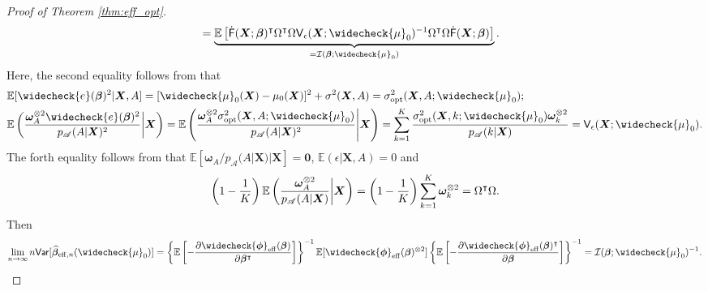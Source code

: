 \documentclass[11pt]{article}
\numberwithin{equation}{section}
\theoremstyle{definition}
\theoremstyle{remark}
\newcommand{\bX}{\bm{X}}
\newcommand{\bbeta}{\bm{\beta}}
\newcommand{\bomega}{\bm{\omega}}
\newcommand{\bphi}{\bm{\phi}}
\newcommand{\bbE}{\mathbb{E}}
\newcommand{\cI}{\mathcal{I}}
\newcommand{\sA}{\mathscr{A}}
\newcommand{\sfF}{\mathsf{F}}
\newcommand{\sfV}{\mathsf{V}}
\newcommand{\sfvar}{\mathsf{Var}}
\newcommand{\bzero}{\mathbf{0}}	%
\newcommand{\eff}{\mathrm{eff}}
\newcommand{\opt}{\mathrm{opt}}
\begin{document}
\begin{proof}[Proof of Theorem \ref{thm:eff_opt}]
\begin{align*}
	&= \underbrace{\bbE\left[ \dot{\sfF}(\bX;\bbeta)^{\intercal}\Omega^{\intercal}\Omega \sfV_{\epsilon}(\bX;\widecheck{\mu}_{0})^{-1} \Omega^{\intercal}\Omega\dot{\sfF}(\bX;\bbeta) \right]}_{= \cI(\bbeta;\widecheck{\mu}_{0})}.
	\end{align*}
	Here, the second equality follows from that
	\begin{align*}
		&\bbE[\widecheck{e}(\bbeta)^{2}|\bX,A] = [\widecheck{\mu}_{0}(\bX) - \mu_{0}(\bX)]^{2} + \sigma^{2}(\bX,A) = \sigma_{\opt}^{2}(\bX,A;\widecheck{\mu}_{0});\\
		&\bbE\left( {\bomega_{A}^{\otimes 2}\widecheck{e}(\bbeta)^{2} \over p_{\sA}(A|\bX)^{2}}\middle|\bX \right) = \bbE\left( {\bomega_{A}^{\otimes 2}\sigma_{\opt}^{2}(\bX,A;\widecheck{\mu}_{0}) \over p_{\sA}(A|\bX)^{2}}\middle|\bX \right) = \sum_{k=1}^{K}{\sigma_{\opt}^{2}(\bX,k;\widecheck{\mu}_{0})\bomega_{k}^{\otimes 2} \over p_{\sA}(k|\bX)} = \sfV_{\epsilon}(\bX;\widecheck{\mu}_{0}).
	\end{align*}
	The forth equality follows from that $ \bbE[\bomega_{A}/p_{\sA}(A|\bX)|\bX] = \bzero $, $ \bbE(\epsilon|\bX,A) = 0 $ and
	\[ \left( 1 - {1 \over K} \right)\bbE\left( {\bomega_{A}^{\otimes 2} \over p_{\sA}(A|\bX)}\middle|\bX \right) = \left( 1 - {1 \over K} \right)\sum_{k=1}^{K}\bomega_{k}^{\otimes 2} = \Omega^{\intercal}\Omega. \]
	Then
	\[ \lim_{n\to\infty}n\sfvar[\widehat{\bbeta}_{\eff,n}(\widecheck{\mu}_{0})] = \left\{ \bbE \left[-{\partial \widecheck{\bphi}_{\eff}(\bbeta) \over \partial \bbeta^{\intercal}}\right]\right\}^{-1}\bbE[\widecheck{\bphi}_{\eff}(\bbeta)^{\otimes 2}]\left\{ \bbE \left[-{\partial \widecheck{\bphi}_{\eff}(\bbeta)^{\intercal} \over \partial \bbeta}\right]\right\}^{-1} = \cI(\bbeta;\widecheck{\mu}_{0})^{-1}. \]
	

\end{proof}
\end{document}
